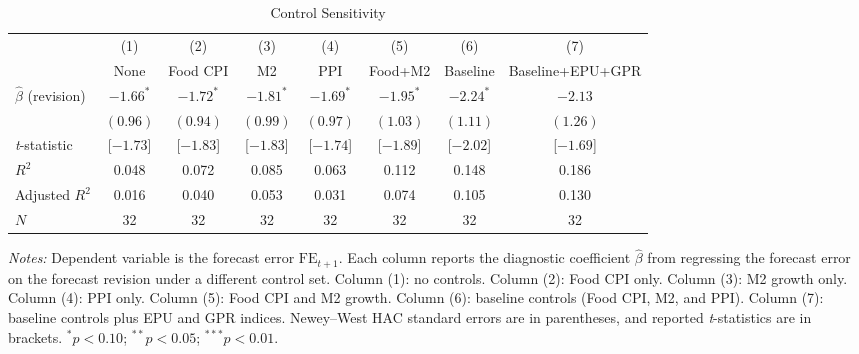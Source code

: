 \begin{table}[!htbp]
\centering
\begin{threeparttable}
\caption{Control Sensitivity}
\label{tab:control_sensitivity}
\small
\begin{tabular}{lccccccc}
\toprule
 & (1) & (2) & (3) & (4) & (5) & (6) & (7) \\
 & None & Food CPI & M2 & PPI & Food+M2 & Baseline & Baseline+EPU+GPR \\
\midrule
$\hat{\beta}$ (revision) & $-1.66^{*}$ & $-1.72^{*}$ & $-1.81^{*}$ & $-1.69^{*}$ & $-1.95^{*}$ & $-2.24^{*}$ & $-2.13$ \\
 & $(0.96)$ & $(0.94)$ & $(0.99)$ & $(0.97)$ & $(1.03)$ & $(1.11)$ & $(1.26)$ \\
\addlinespace
\textit{t}-statistic & [$-1.73$] & [$-1.83$] & [$-1.83$] & [$-1.74$] & [$-1.89$] & [$-2.02$] & [$-1.69$] \\
\addlinespace
$R^2$ & 0.048 & 0.072 & 0.085 & 0.063 & 0.112 & 0.148 & 0.186 \\
Adjusted $R^2$ & 0.016 & 0.040 & 0.053 & 0.031 & 0.074 & 0.105 & 0.130 \\
$N$ & 32 & 32 & 32 & 32 & 32 & 32 & 32 \\
\bottomrule
\end{tabular}
\begin{tablenotes}[flushleft]
\footnotesize
\item \textit{Notes:} Dependent variable is the forecast error $\text{FE}_{t+1}$. Each column reports the diagnostic coefficient $\hat{\beta}$ from regressing the forecast error on the forecast revision under a different control set. Column (1): no controls. Column (2): Food CPI only. Column (3): M2 growth only. Column (4): PPI only. Column (5): Food CPI and M2 growth. Column (6): baseline controls (Food CPI, M2, and PPI). Column (7): baseline controls plus EPU and GPR indices. Newey--West HAC standard errors are in parentheses, and reported \textit{t}-statistics are in brackets. $^{*}p<0.10$; $^{**}p<0.05$; $^{***}p<0.01$.
\end{tablenotes}
\end{threeparttable}
\end{table}
